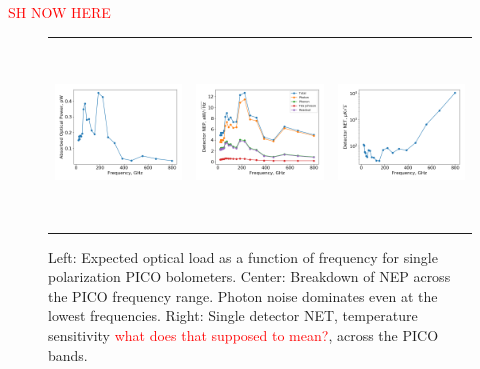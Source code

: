 \documentclass[]{spie}  %
\newcommand{\comr}[1]{\textcolor{red}{#1}}
\begin{document}
\comr{SH NOW HERE}

\begin{figure} [ht]
\begin{center}
\begin{tabular}{ccc} %
\hspace{-1.4cm} \includegraphics[height=4.9cm]{system_Popt.png} & \hspace{-0.7cm} \includegraphics[height=4.9cm]{system_NEP.png} &\hspace{-0.7cm}  \includegraphics[height=4.9cm]{system_NET.png} 
\end{tabular}
\end{center}
\caption{ \label{fig:popt} \label{fig:noise} \label{fig:net} 
Left: Expected optical load as a function of frequency for single polarization PICO bolometers. 
Center: Breakdown of NEP across the PICO frequency range.  Photon noise dominates even at the lowest frequencies. 
Right: Single detector NET, temperature sensitivity \comr{what does that supposed to mean?},  across the PICO bands. 
}
\end{figure} 
\end{document}
